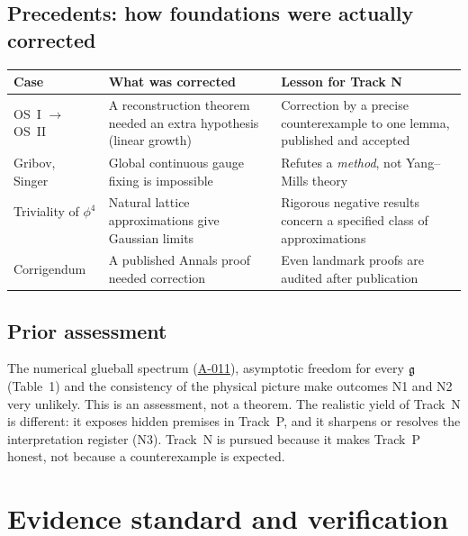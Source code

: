 \documentclass[11pt,a4paper]{article}
\newcommand{\idref}[1]{\hyperref[#1]{\textsf{#1}}}
\begin{document}
\subsection{Precedents: how foundations were actually corrected}
\begin{center}\small
\begin{tabularx}{\textwidth}{@{}P{3.6cm}>{\raggedright\arraybackslash}X>{\raggedright\arraybackslash}X@{}}
\toprule
Case & What was corrected & Lesson for Track N\\
\midrule
OS~I $\to$ OS~II~\cite{OS73,OS75} & A reconstruction theorem needed an extra hypothesis (linear growth) & Correction by a precise counterexample to one lemma, published and accepted\\
Gribov, Singer~\cite{Gri78,Sin78} & Global continuous gauge fixing is impossible & Refutes a \emph{method}, not Yang--Mills theory\\
Triviality of $\phi^4$~\cite{Aiz82,Fro82,ADC21} & Natural lattice approximations give Gaussian limits & Rigorous negative results concern a specified class of approximations\\
Corrigendum~\cite{ADC24} & A published Annals proof needed correction & Even landmark proofs are audited after publication\\
\bottomrule
\end{tabularx}
\end{center}

\subsection{Prior assessment}
The numerical glueball spectrum (\idref{A-011}), asymptotic freedom for every $\mathfrak g$ (Table~1) and the consistency of the physical picture make outcomes N1 and N2 very unlikely. This is an assessment, not a theorem. The realistic yield of Track~N is different: it exposes hidden premises in Track~P, and it sharpens or resolves the interpretation register (N3). Track~N is pursued because it makes Track~P honest, not because a counterexample is expected.

\section{Evidence standard and verification}\label{sec:verification}
\end{document}
